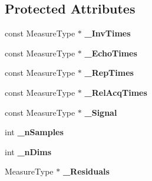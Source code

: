 \subsection*{Protected Attributes}
\begin{DoxyCompactItemize}
\item 
\hypertarget{class_ox_1_1_functions_t1_a4e92c3f06b7ef0327d6625a662db4d1c}{const Measure\-Type $\ast$ {\bfseries \-\_\-\-Inv\-Times}}\label{class_ox_1_1_functions_t1_a4e92c3f06b7ef0327d6625a662db4d1c}

\item 
\hypertarget{class_ox_1_1_functions_t1_adaf6b5335e0014ad37c007a24f150343}{const Measure\-Type $\ast$ {\bfseries \-\_\-\-Echo\-Times}}\label{class_ox_1_1_functions_t1_adaf6b5335e0014ad37c007a24f150343}

\item 
\hypertarget{class_ox_1_1_functions_t1_a719873f2f02b6dcf0ae100f9c9a6884f}{const Measure\-Type $\ast$ {\bfseries \-\_\-\-Rep\-Times}}\label{class_ox_1_1_functions_t1_a719873f2f02b6dcf0ae100f9c9a6884f}

\item 
\hypertarget{class_ox_1_1_functions_t1_abfbc38cf7ea0bbc1b52f48a75f281246}{const Measure\-Type $\ast$ {\bfseries \-\_\-\-Rel\-Acq\-Times}}\label{class_ox_1_1_functions_t1_abfbc38cf7ea0bbc1b52f48a75f281246}

\item 
\hypertarget{class_ox_1_1_functions_t1_a8f87abd26c39fddd3e2b0085e97c6571}{const Measure\-Type $\ast$ {\bfseries \-\_\-\-Signal}}\label{class_ox_1_1_functions_t1_a8f87abd26c39fddd3e2b0085e97c6571}

\item 
\hypertarget{class_ox_1_1_functions_t1_a32038248ea53c223d9d99cd9cee36378}{int {\bfseries \-\_\-n\-Samples}}\label{class_ox_1_1_functions_t1_a32038248ea53c223d9d99cd9cee36378}

\item 
\hypertarget{class_ox_1_1_functions_t1_a4d42b89cb62d20c80e3210b17a692ed1}{int {\bfseries \-\_\-n\-Dims}}\label{class_ox_1_1_functions_t1_a4d42b89cb62d20c80e3210b17a692ed1}

\item 
\hypertarget{class_ox_1_1_functions_t1_a9385588387da7b25ebcf924eaf6cef8d}{Measure\-Type $\ast$ {\bfseries \-\_\-\-Residuals}}\label{class_ox_1_1_functions_t1_a9385588387da7b25ebcf924eaf6cef8d}

\end{DoxyCompactItemize}


